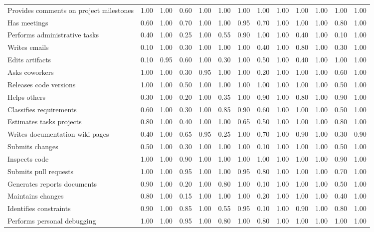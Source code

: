 \begin{tabular}{lrrrrrrrrrrrr}
Provides comments on project milestones & 1.00 & 1.00 & 0.60 & 1.00 & 1.00 & 1.00 & 1.00 & 1.00 & 1.00 & 1.00 & 1.00 & 1.00 \\
Has meetings & 0.60 & 1.00 & 0.70 & 1.00 & 1.00 & 0.95 & 0.70 & 1.00 & 1.00 & 1.00 & 0.80 & 1.00 \\
Performs administrative tasks & 0.40 & 1.00 & 0.25 & 1.00 & 0.55 & 0.90 & 1.00 & 1.00 & 0.40 & 1.00 & 0.10 & 1.00 \\
Writes emails & 0.10 & 1.00 & 0.30 & 1.00 & 1.00 & 1.00 & 0.40 & 1.00 & 0.80 & 1.00 & 0.30 & 1.00 \\
Edits artifacts & 0.10 & 0.95 & 0.60 & 1.00 & 0.30 & 1.00 & 0.50 & 1.00 & 0.40 & 1.00 & 1.00 & 1.00 \\
Asks coworkers & 1.00 & 1.00 & 0.30 & 0.95 & 1.00 & 1.00 & 0.20 & 1.00 & 1.00 & 1.00 & 0.60 & 1.00 \\
Releases code versions & 1.00 & 1.00 & 0.50 & 1.00 & 1.00 & 1.00 & 1.00 & 1.00 & 1.00 & 1.00 & 0.50 & 1.00 \\
Helps others & 0.30 & 1.00 & 0.20 & 1.00 & 0.35 & 1.00 & 0.90 & 1.00 & 0.80 & 1.00 & 0.90 & 1.00 \\
Classifies requirements & 0.60 & 1.00 & 0.30 & 1.00 & 0.85 & 0.90 & 0.60 & 1.00 & 1.00 & 1.00 & 0.50 & 1.00 \\
Estimates tasks projects & 0.80 & 1.00 & 0.40 & 1.00 & 1.00 & 0.65 & 0.50 & 1.00 & 1.00 & 1.00 & 0.80 & 1.00 \\
Writes documentation wiki pages & 0.40 & 1.00 & 0.65 & 0.95 & 0.25 & 1.00 & 0.70 & 1.00 & 0.90 & 1.00 & 0.30 & 0.90 \\
Submits changes & 0.50 & 1.00 & 0.30 & 1.00 & 1.00 & 1.00 & 0.10 & 1.00 & 1.00 & 1.00 & 0.50 & 1.00 \\
Inspects code & 1.00 & 1.00 & 0.90 & 1.00 & 1.00 & 1.00 & 1.00 & 1.00 & 1.00 & 1.00 & 0.90 & 1.00 \\
Submits pull requests & 1.00 & 1.00 & 0.95 & 1.00 & 1.00 & 0.95 & 0.80 & 1.00 & 1.00 & 1.00 & 0.70 & 1.00 \\
Generates reports documents & 0.90 & 1.00 & 0.20 & 1.00 & 0.80 & 1.00 & 0.10 & 1.00 & 1.00 & 1.00 & 0.50 & 1.00 \\
Maintains changes & 0.80 & 1.00 & 0.15 & 1.00 & 1.00 & 1.00 & 0.20 & 1.00 & 1.00 & 1.00 & 0.40 & 1.00 \\
Identifies constraints & 0.90 & 1.00 & 0.85 & 1.00 & 0.55 & 0.95 & 0.10 & 1.00 & 0.90 & 1.00 & 0.80 & 1.00 \\
Performs personal debugging & 1.00 & 1.00 & 0.95 & 1.00 & 0.80 & 1.00 & 0.80 & 1.00 & 1.00 & 1.00 & 1.00 & 1.00 \\

\end{tabular}
